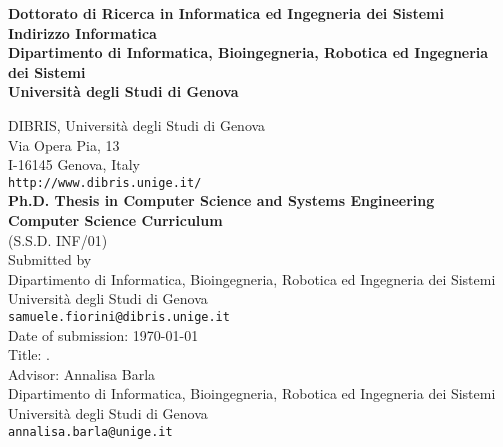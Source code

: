 \documentclass[twoside,openright]{disithesis}
\begin{document}
\title{\longtitle}

\author{\me}


\technumber{$\bm{\pi\pi}$}

\maketitle

\begin{addresspage}
{\bf
Dottorato di Ricerca in Informatica ed Ingegneria dei Sistemi\\
Indirizzo Informatica\\
Dipartimento di Informatica, Bioingegneria, Robotica ed Ingegneria dei Sistemi \\
Universit\`a degli Studi di Genova\\[2ex]}

DIBRIS, Universit\`a degli Studi di Genova\\
Via Opera Pia, 13\\
I-16145 Genova, Italy\\
{\tt http://www.dibris.unige.it/}\\[2ex]

{\bf
Ph.D. Thesis in Computer Science and Systems Engineering\\
Computer Science Curriculum}\\
(S.S.D. INF/01)\\[2ex]

Submitted by \me\\
Dipartimento di Informatica, Bioingegneria, Robotica ed Ingegneria dei Sistemi\\
Universit\`a degli Studi di Genova\\
{\tt samuele.fiorini@dibris.unige.it}\\[2ex]

Date of submission:
\today\\[2ex]

Title:
\runningtitle.\\[2ex]

Advisor: %
Annalisa Barla\\
Dipartimento di Informatica, Bioingegneria, Robotica ed Ingegneria dei Sistemi\\
Universit\`a degli Studi di Genova\\
{\tt annalisa.barla@unige.it}\\[2ex]


\end{addresspage}
\end{document}
